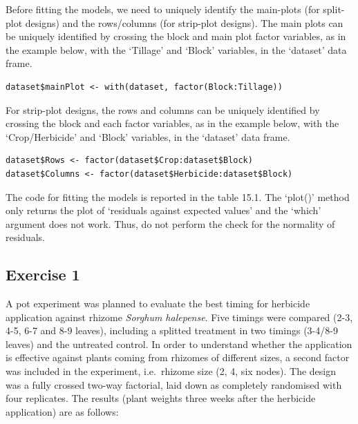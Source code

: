 \documentclass[a4paper,12pt,oneside]{book}
\begin{document}
Before fitting the models, we need to uniquely identify the main-plots (for split-plot designs) and the rows/columns (for strip-plot designs). The main plots can be uniquely identified by crossing the block and main plot factor variables, as in the example below, with the `Tillage' and `Block' variables, in the `dataset' data frame.

\begin{verbatim}
dataset$mainPlot <- with(dataset, factor(Block:Tillage))
\end{verbatim}

For strip-plot designs, the rows and columns can be uniquely identified by crossing the block and each factor variables, as in the example below, with the `Crop/Herbicide' and `Block' variables, in the `dataset' data frame.

\begin{verbatim}
dataset$Rows <- factor(dataset$Crop:dataset$Block)
dataset$Columns <- factor(dataset$Herbicide:dataset$Block)
\end{verbatim}

The code for fitting the models is reported in the table 15.1. The `plot()' method only returns the plot of `residuals against expected values' and the `which' argument does not work. Thus, do not perform the check for the normality of residuals.

\hypertarget{exercise-1-7}{%
\subsection{Exercise 1}\label{exercise-1-7}}

A pot experiment was planned to evaluate the best timing for herbicide application against rhizome \emph{Sorghum halepense}. Five timings were compared (2-3, 4-5, 6-7 and 8-9 leaves), including a splitted treatment in two timings (3-4/8-9 leaves) and the untreated control. In order to understand whether the application is effective against plants coming from rhizomes of different sizes, a second factor was included in the experiment, i.e.~rhizome size (2, 4, six nodes). The design was a fully crossed two-way factorial, laid down as completely randomised with four replicates. The results (plant weights three weeks after the herbicide application) are as follows:
\end{document}
